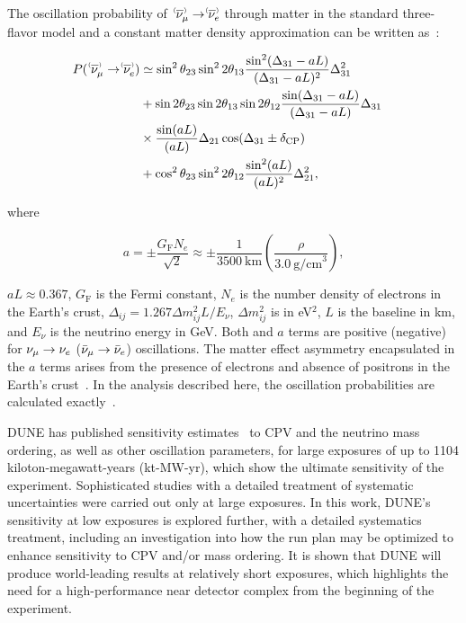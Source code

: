 The oscillation probability of $\;\nu^{\bracketbar}_\mu \rightarrow \nu^{\bracketbar}_e$ through matter in the standard three-flavor model and a constant matter density approximation can be written as~\cite{Nunokawa:2007qh}:
\begin{linenomath*}
  \begin{equation}
    \begin{aligned}
      P(\;\nu^{\bracketbar}_\mu \rightarrow \nu^{\bracketbar}_e) & \simeq \sin^2 \theta_{23} \sin^2 2 \theta_{13} 
      \frac{ \sin^2(\Delta_{31} - aL)}{(\Delta_{31}-aL)^2} \Delta_{31}^2 \\
      & + \sin 2 \theta_{23} \sin 2 \theta_{13} \sin 2 \theta_{12}\frac{ \sin(\Delta_{31} - aL)}{(\Delta_{31}-aL)} \Delta_{31} \\
      &\times \frac{\sin(aL)}{(aL)} \Delta_{21} \cos (\Delta_{31} \pm \deltacp) & \\
      & + \cos^2 \theta_{23} \sin^2 2 \theta_{12} \frac {\sin^2(aL)}{(aL)^2} \Delta_{21}^2,
    \end{aligned}
    \label{eqn:appprob}
  \end{equation}
\end{linenomath*}
where
\begin{linenomath*}
  \begin{equation*}
    a = \pm \frac{G_{\mathrm{F}}N_e}{\sqrt{2}} \approx \pm\frac{1}{3500~\mathrm{km}}\left(\frac{\rho}{3.0~\mathrm{g/cm}^{3}}\right),
  \end{equation*}
\end{linenomath*}
$aL \approx 0.367$, $G_{\mathrm{F}}$ is the Fermi constant, $N_e$ is the number density of electrons in the Earth's crust, $\Delta_{ij} = 1.267 \Delta m^2_{ij} L/E_\nu$, $\Delta m^2_{ij}$ is in eV$^{2}$, $L$ is the baseline in km, and $E_\nu$ is the neutrino energy in GeV.
Both \deltacp and $a$ terms are positive (negative) for $\nu_\mu \to \nu_e$ ($\bar\nu_\mu \to \bar\nu_e$) oscillations. The matter effect asymmetry encapsulated in the $a$ terms arises from the presence of electrons and absence of positrons in the Earth's crust~\cite{Wolfenstein:1977ue,Mikheev:1986gs}. In the analysis described here, the oscillation probabilities are calculated exactly~\cite{Kopp:2006wp}.

DUNE has published sensitivity estimates~\cite{Abi:2020qib} to CPV and the neutrino mass ordering, as well as other oscillation parameters, for large exposures of up to 1104 kiloton-megawatt-years (kt-MW-yr), which show the ultimate sensitivity of the experiment. Sophisticated studies with a detailed treatment of systematic uncertainties were carried out only at large exposures. In this work, DUNE's sensitivity at low exposures is explored further, with a detailed systematics treatment, including an investigation into how the run plan may be optimized to enhance sensitivity to CPV and/or mass ordering. It is shown that DUNE will produce world-leading results at relatively short exposures, which highlights the need for a high-performance near detector complex from the beginning of the experiment. 

